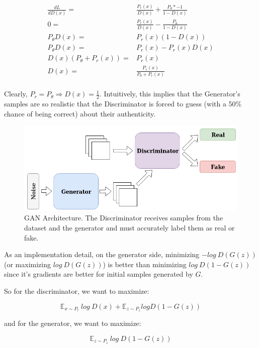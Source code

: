 \begin{align*}
	\label{eq:optD}
	\frac{d L}{d D(x)} =& \frac{P_r(x)}{D(x)} + \frac{P_\theta * -1}{1-D(x)} \\
	0 =& \frac{P_r(x)}{D(x)} - \frac{P_\theta}{1-D(x)} \\
	P_\theta D(x) =& P_r(x) (1-D(x)) \\
	P_\theta D(x) =& P_r(x)-P_r(x) D(x) \\
	D(x)(P_\theta + P_r(x)) =& P_r(x)\\
	D(x) =& \frac{P_r(x)}{P_\theta + P_r(x)}\\
\end{align*}

Clearly, $P_r = P_\theta \Rightarrow D(x) = \frac{1}{2}$. Intuitively, this implies that the Generator's samples are so realistic that the Discriminator is forced to guess (with a 50\% chance of being correct) about their authenticity. 

\begin{figure}[h!]
	\centering
	\includegraphics[width=\linewidth]{media/gan.png}
	\caption{GAN Architecture. The Discriminator receives samples from the dataset and the generator and must accurately label them as real or fake.}
	\label{fig:gan}
\end{figure}

As an implementation detail, on the generator side, minimizing $-log~D(G(z))$ (or maximizing $log~D(G(z))$) is better than minimizing $log~D(1-G(z))$ since it's gradients are better for initial samples generated by $G$.

So for the discriminator, we want to maximize:

\begin{equation}
	\label{eq:maxD}
	\mathbb{E}_{x \sim P_r}~log~D(x) + \mathbb{E}_{z \sim P_z} log D(1-G(z))
\end{equation}

and for the generator, we want to maximize:

\begin{equation}
	\label{eq:maxG}
	\mathbb{E}_{z \sim P_z}~log~D(1-G(z))
\end{equation}

